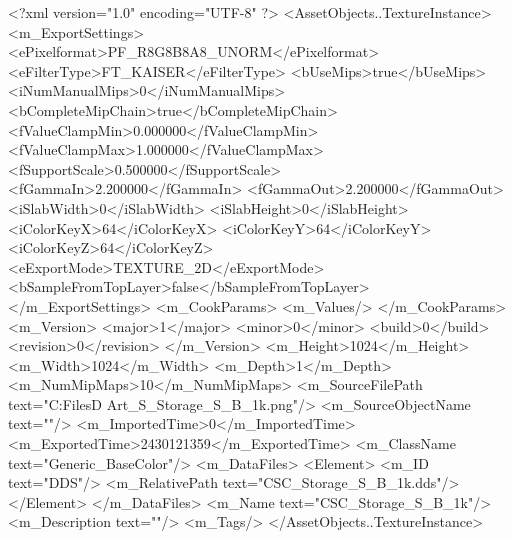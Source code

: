 <?xml version="1.0" encoding="UTF-8" ?>
<AssetObjects..TextureInstance>
	<m_ExportSettings>
		<ePixelformat>PF_R8G8B8A8_UNORM</ePixelformat>
		<eFilterType>FT_KAISER</eFilterType>
		<bUseMips>true</bUseMips>
		<iNumManualMips>0</iNumManualMips>
		<bCompleteMipChain>true</bCompleteMipChain>
		<fValueClampMin>0.000000</fValueClampMin>
		<fValueClampMax>1.000000</fValueClampMax>
		<fSupportScale>0.500000</fSupportScale>
		<fGammaIn>2.200000</fGammaIn>
		<fGammaOut>2.200000</fGammaOut>
		<iSlabWidth>0</iSlabWidth>
		<iSlabHeight>0</iSlabHeight>
		<iColorKeyX>64</iColorKeyX>
		<iColorKeyY>64</iColorKeyY>
		<iColorKeyZ>64</iColorKeyZ>
		<eExportMode>TEXTURE_2D</eExportMode>
		<bSampleFromTopLayer>false</bSampleFromTopLayer>
	</m_ExportSettings>
	<m_CookParams>
		<m_Values/>
	</m_CookParams>
	<m_Version>
		<major>1</major>
		<minor>0</minor>
		<build>0</build>
		<revision>0</revision>
	</m_Version>
	<m_Height>1024</m_Height>
	<m_Width>1024</m_Width>
	<m_Depth>1</m_Depth>
	<m_NumMipMaps>10</m_NumMipMaps>
	<m_SourceFilePath text="C:\Users\Shadow\Desktop\Working Files\3D Art\Storage_S\CSC_Storage_S_B_1k.png"/>
	<m_SourceObjectName text=""/>
	<m_ImportedTime>0</m_ImportedTime>
	<m_ExportedTime>2430121359</m_ExportedTime>
	<m_ClassName text="Generic_BaseColor"/>
	<m_DataFiles>
		<Element>
			<m_ID text="DDS"/>
			<m_RelativePath text="CSC_Storage_S_B_1k.dds"/>
		</Element>
	</m_DataFiles>
	<m_Name text="CSC_Storage_S_B_1k"/>
	<m_Description text=""/>
	<m_Tags/>
</AssetObjects..TextureInstance>

